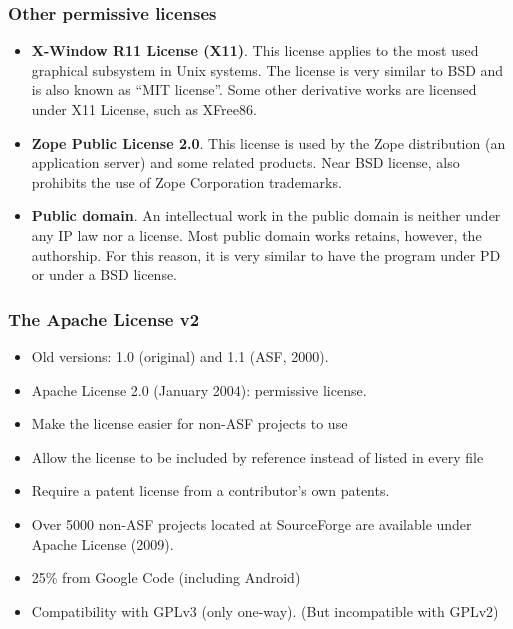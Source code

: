 
\begin{frame}
\frametitle{Other permissive licenses}

{\small
\begin{itemize}

\item {\bf X-Window R11 License (X11)}. This license applies to the
  most used graphical subsystem in Unix systems. The license is very
  similar to BSD and is also known as ``MIT license''. Some other
  derivative works are licensed under X11 License, such as XFree86.

\item {\bf Zope Public License 2.0}. This license is used by the Zope
  distribution (an application server) and some related products. Near
  BSD license, also prohibits the use of Zope Corporation trademarks.

\item {\bf Public domain}. An intellectual work in the public domain
  is neither under any IP law nor a license. Most public domain works
  retains, however, the authorship. For this reason, it is very
  similar to have the program under PD or under a BSD license.

\end{itemize}
}

\end{frame}




\begin{frame}
\frametitle{The Apache License v2}

\begin{itemize}
\item Old versions: 1.0 (original) and 1.1 (ASF, 2000).
\item Apache License 2.0 (January 2004): permissive license.
\item Make the license easier for non-ASF projects to use
\item Allow the license to be included by reference instead of listed in every file
\item Require a patent license from a contributor's own patents.
\item Over 5000 non-ASF projects located at SourceForge are available under Apache License (2009). 
\item 25\% from Google Code (including Android)
\item Compatibility with GPLv3 (only one-way). (But incompatible with GPLv2)

\end{itemize}

\end{frame}


